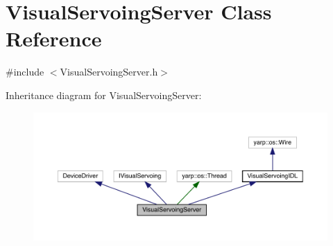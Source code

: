 \hypertarget{classVisualServoingServer}{}\section{Visual\+Servoing\+Server Class Reference}
\label{classVisualServoingServer}


{\ttfamily \#include $<$Visual\+Servoing\+Server.\+h$>$}



Inheritance diagram for Visual\+Servoing\+Server\+:
\nopagebreak
\begin{figure}[H]
\begin{center}
\leavevmode
\includegraphics[width=350pt]{classVisualServoingServer__inherit__graph}
\end{center}
\end{figure}
